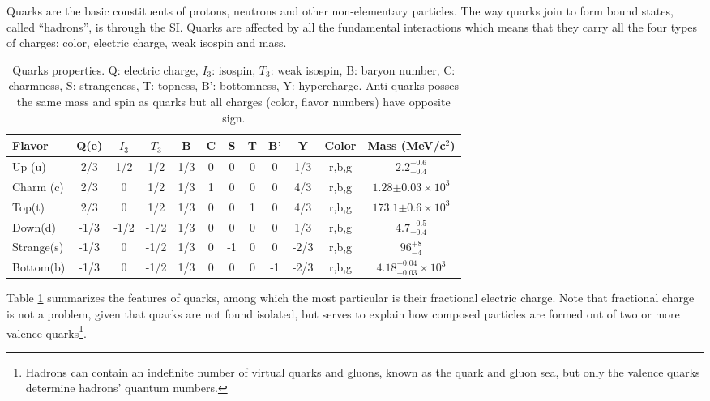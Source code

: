 \noindent Quarks are the basic constituents of protons, neutrons and other non-elementary particles. The way quarks join to form bound states, called ``hadrons'', is through the SI. Quarks are affected by all the fundamental interactions which means that they carry all the four types of charges: color, electric charge, weak isospin and mass.

\begin{center}
\begin{table}[h!]
\centering
\footnotesize
\begin{tabular}{lccccccccccc} \hline
Flavor     & Q(e) & $I_3$ & $T_3$  & B   & C & S  & T & B'  & Y    & Color &Mass (MeV/c$^2$)                  \\ \hline
Up (u)     & 2/3  & 1/2   &  1/2   & 1/3 & 0 & 0  & 0 & 0   & 1/3  & r,b,g &$2.2^{+0.6}_{-0.4}$               \\ %
Charm (c)  & 2/3  & 0     &  1/2   & 1/3 & 1 & 0  & 0 & 0   & 4/3  & r,b,g &$1.28 {\pm 0.03}\times 10^3$      \\ %
Top(t)     & 2/3  & 0     &  1/2   & 1/3 & 0 & 0  & 1 & 0   & 4/3  & r,b,g &$173.1{\pm0.6}\times 10^3$        \\ \hline
Down(d)    & -1/3 & -1/2  & -1/2   & 1/3 & 0 & 0  & 0 & 0   & 1/3  & r,b,g &$4.7^{+0.5}_{-0.4}$               \\ %
Strange(s) & -1/3 & 0     & -1/2   & 1/3 & 0 & -1 & 0 & 0   & -2/3 & r,b,g &$96^{+8}_{-4}$                    \\ %
Bottom(b)  & -1/3 & 0     & -1/2   & 1/3 & 0 & 0  & 0 & -1  & -2/3 & r,b,g &$4.18^{+0.04}_{-0.03}\times 10^3$ \\ \hline
\end{tabular}
\caption[Quarks properties.]{Quarks properties\cite{pdg}. Q: electric charge, $I_3$: isospin, $T_3$: weak isospin, B: baryon number, C: charmness, S: strangeness, T: topness, B': bottomness, Y: hypercharge. Anti-quarks posses the same mass and spin as quarks but all charges (color, flavor numbers) have opposite sign.}\label{quarks}
\end{table}
\end{center}

\noindent Table \ref{quarks} summarizes the features of quarks, among which the most particular is their fractional electric charge. Note that fractional charge is not a problem, given that quarks are not found isolated, but serves to explain how composed particles are formed out of two or more valence quarks\footnote{Hadrons can contain an indefinite number of virtual quarks and gluons, known as the quark and gluon sea, but only the valence quarks determine hadrons' quantum numbers.}.\\

